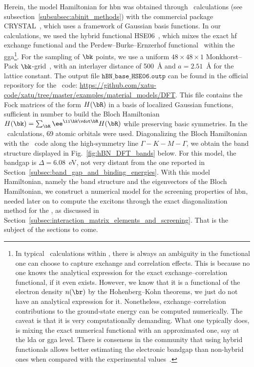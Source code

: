 Herein, the model Hamiltonian for \gls{hbn} was obtained through \dft~calculations (see subsection~\ref{subsubsec:abinit_methods}) with the commercial package \textsc{CRYSTAL}~\cite{CRYSTAL_23}, which uses a framework of Gaussian basis functions.
In our calculations, we used the hybrid functional HSE06~\cite{Heyd_Scuseria_Ernzerhof_2003}, which mixes the exact \gls{hf} exchange functional and the Perdew--Burke--Ernzerhof functional~\cite{Perdew_1996} within the \gls{gga}\footnote{In typical \abinit~calculations within \dft, there is always an ambiguity in the functional one can choose to capture exchange and correlation effects. This is because no one knows the analytical expression for the exact exchange--correlation functional, if it even exists. However, we know that it is a functional of the electron density $n(\br)$ by the Hohenberg--Kohn theorems, we just do not have an analytical expression for it. Nonetheless, exchange--correlation contributions to the ground-state energy can be computed numerically. The caveat is that it is very computationally demanding. What one typically does, is mixing the exact numerical functional with an approximated one, say at the \gls{lda} or \gls{gga} level. There is consensus in the community that using hybrid functionals allows better estimating the electronic bandgap than non-hybrid ones when compared with the experimental values~\cite{PhysRevMaterials.8.043803}.}.
For the sampling of $\bk$ points, we use a uniform $48\times48\times1$ Monkhorst--Pack $\bk$-grid~\cite{Monkhorst_Pack_1976}, with an interlayer distance of 500~\unit{\angstrom} and $a=2.51$~\unit{\angstrom} for the lattice constant.
The output file $\texttt{hBN\_base\_HSE06.outp}$ can be found in the official repository for the \xatu~code: \url{https://github.com/xatu-code/xatu/tree/master/examples/material_models/DFT}.
This file contains the Fock matrices of the form $H(\bR)$ in a basis of localized Gaussian functions, sufficient in number to build the Bloch Hamiltonian $H(\bk) = \sum_{\bR} \ee^{\ii \bk \vdot \bR} H(\bR)$ while preserving basic symmetries.
In the \dft~calculations, 69 atomic orbitals were used.
Diagonalizing the Bloch Hamiltonian with the \xatu~code along the high-symmetry line $\Gamma-K-M-\Gamma$, we obtain the band structure displayed in Fig.~\ref{fig:hBN_DFT_bands} below.
For this model, the bandgap is $\Delta = 6.08$~\unit{\electronvolt}, not very distant from the one reported in Section~\ref{subsec:band_gap_and_binding_energies}.
With this model Hamiltonian, namely the band structure and the eigenvectors of the Bloch Hamiltonian, we construct a numerical model for the screening properties of \gls{hbn}, needed later on to compute the excitons through the exact diagonalization method for the \bse, as discussed in Section~\ref{subsec:interaction_matrix_elements_and_screening}.
That is the subject of the sections to come.

